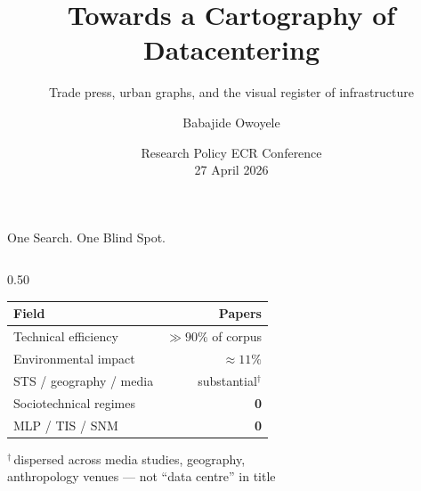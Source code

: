\documentclass[aspectratio=169,11pt]{beamer}
\title{Towards a Cartography of Datacentering}
\subtitle{Trade press, urban graphs, and the visual register of infrastructure}
\author{Babajide Owoyele}
\institute{Erasmus University Rotterdam}
\date{Research Policy ECR Conference \\ 27 April 2026}
\newcommand{\iconfull}[2]{\textcolor{#1}{\faIcon{#2}}}
\begin{document}
\begin{frame}[shrink=4]
\titlepage
\end{frame}

\begin{frame}{\iconfull{dcblue}{search}\enspace One Search. One Blind Spot.}
\begin{columns}[T]
\begin{column}{0.50\textwidth}
  \vspace{0.4em}
  \footnotesize
  \begin{tabular}{@{}lr@{}}
    \toprule
    \textbf{Field} & \textbf{Papers} \\
    \midrule
    Technical efficiency  & ${\gg}90\%$ of corpus \\
    Environmental impact  & ${\approx}11\%$ \\
    STS / geography / media & substantial$^\dagger$ \\
    \midrule
    \alert{Sociotechnical regimes} & \alert{\textbf{0}} \\
    \alert{MLP / TIS / SNM}       & \alert{\textbf{0}} \\
    \bottomrule
  \end{tabular}
  \vspace{0.5em}

  \footnotesize $^\dagger$\,dispersed across media studies, geography,\\
  anthropology venues — not ``data centre'' in title


\end{column}
\end{columns}
\end{frame}
\end{document}
